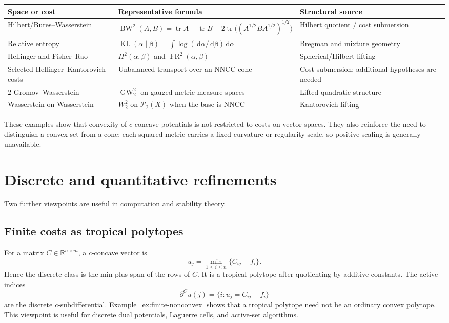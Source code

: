\documentclass[11pt,a4paper]{article}
\theoremstyle{definition}
\theoremstyle{remark}
\newcommand{\R}{\mathbb R}
\newcommand{\Pcal}{\mathcal P}
\newcommand{\KL}{\operatorname{KL}}
\newcommand{\BW}{\operatorname{BW}}
\newcommand{\GW}{\operatorname{GW}}
\newcommand{\FR}{\operatorname{FR}}
\newcommand{\dd}{\,\mathrm d}
\newcommand{\tr}{\operatorname{tr}}
\begin{document}
\begin{center}
\small
\begin{tabularx}{\linewidth}{@{}>{\raggedright\arraybackslash}p{.26\linewidth}
  >{\raggedright\arraybackslash}p{.39\linewidth}X@{}}
\toprule
Space or cost & Representative formula & Structural source \\
\midrule
Hilbert/Bures--Wasserstein &
$\BW^2(A,B)=\tr A+\tr B-2\tr\!\bigl((A^{1/2}BA^{1/2})^{1/2}\bigr)$ &
Hilbert quotient / cost submersion \\
Relative entropy &
$\KL(\alpha\mid\beta)=\int\log(\dd\alpha/\dd\beta)\dd\alpha$ &
Bregman and mixture geometry \\
Hellinger and Fisher--Rao &
$H^2(\alpha,\beta)$ and $\FR^2(\alpha,\beta)$ &
Spherical/Hilbert lifting \\
Selected Hellinger--Kantorovich costs &
Unbalanced transport over an NNCC cone &
Cost submersion; additional hypotheses are needed \\
$2$-Gromov--Wasserstein &
$\GW_2^2$ on gauged metric-measure spaces &
Lifted quadratic structure \\
Wasserstein-on-Wasserstein &
$W_2^2$ on $\Pcal_2(X)$ when the base is NNCC &
Kantorovich lifting \\
\bottomrule
\end{tabularx}
\end{center}

These examples show that convexity of $c$-concave potentials is not restricted
to costs on vector spaces. They also reinforce the need to distinguish a
convex set from a cone: each squared metric carries a fixed curvature or
regularity scale, so positive scaling is generally unavailable.

\section{Discrete and quantitative refinements}

Two further viewpoints are useful in computation and stability theory.

\subsection{Finite costs as tropical polytopes}

For a matrix $C\in\R^{n\times m}$, a $c$-concave vector is
\[
  u_j=\min_{1\leq i\leq n}\{C_{ij}-f_i\}.
\]
Hence the discrete class is the min-plus span of the rows of $C$. It is a
tropical polytope after quotienting by additive constants. The active indices
\[
  \partial^C u(j)=\{i:u_j=C_{ij}-f_i\}
\]
are the discrete $c$-subdifferential. Example~\ref{ex:finite-nonconvex} shows
that a tropical polytope need not be an ordinary convex polytope. This
viewpoint is useful for discrete dual potentials, Laguerre cells, and active-set
algorithms.
\end{document}
